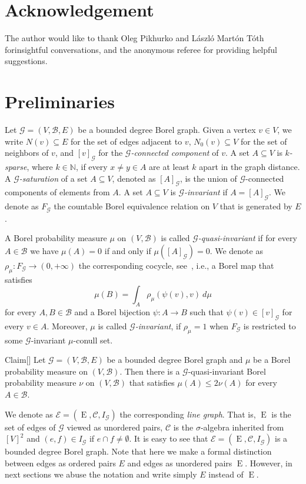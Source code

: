 \documentclass[10pt]{amsart}
\theoremstyle{definition}
\newcommand{\fE}{\operatorname{E}}
\newcommand{\clG}{\mathcal{G}}
\newcommand{\clB}{\mathcal{B}}
\newcommand{\clE}{\mathcal{E}}
\newcommand{\clC}{\mathcal{C}}
\newcommand{\bbZ}{\mathbb{N}}
\begin{document}
\section*{Acknowledgement}
The author would like to thank Oleg Pikhurko and László Martón Tóth for\linebreak insightful conversations, and the anonymous referee for providing helpful suggestions.



\section{Preliminaries}

Let $\clG=(V,\clB,E)$ be a bounded degree Borel graph. Given a vertex $v\in V$, we write $N(v)\subseteq E$ for the set of edges adjacent to $v$, $N_0(v)\subseteq V$ for the set of neighbors of $v$, and $[v]_\clG$ for the \emph{$\clG$-connected component} of $v$. A set $A\subseteq V$ is \emph{$k$-sparse}, where $k\in \bbZ$, if every $x\not=y\in A$ are at least $k$ apart in the graph distance. A \emph{$\clG$-saturation} of a set $A\subseteq V$, denoted as $[A]_\clG$, is the union of $\clG$-connected components of elements from $A$. A set $A\subseteq V$ is \emph{$\clG$-invariant} if $A=[A]_{\clG}$. We denote as $F_\clG$ the countable Borel equivalence relation on $V$ that is generated by $E$.

A Borel probability measure $\mu$ on $(V,\clB)$ is called \emph{$\clG$-quasi-invariant} if for every $A\in \clB$ we have $\mu(A)=0$ if and only if $\mu([A]_\clG)=0$. We denote as $\rho_\mu:F_\clG\to (0,+\infty)$ the corresponding cocycle, see~\cite[Proposition~8.3]{KechrisMiller}, i.e., a Borel map that satisfies
\[
\mu(B)=\int_A \rho_\mu(\psi(v),v) \ d\mu
\]
for every $A,B\in \clB$ and a Borel bijection $\psi:A\to B$ such that $\psi(v)\in [v]_\clG$ for every $v\in A$. Moreover, $\mu$ is called \emph{$\clG$-invariant}, if $\rho_\mu=1$ when $F_\clG$ is restricted to some $\clG$-invariant $\mu$-conull set.


\begin{enonce}{Claim}[{\cite[Proposition~3.2]{Vizing}\label{cl:quasi invariant}}]
Let $\clG=(V,\clB,E)$ be a bounded degree Borel graph and $\mu$ be a Borel probability measure on $(V,\clB)$. Then there is a $\clG$-quasi-invariant Borel probability measure $\nu$ on $(V,\clB)$ that satisfies $\mu(A)\le 2\nu(A)$ for every $A\in \clB$.
\end{enonce}


We denote as $\clE=(\fE,\clC,I_\clG)$ the corresponding \emph{line graph}. That is, $\fE$ is the set of edges of $\clG$ viewed as unordered pairs, $\clC$ is the $\sigma$-algebra inherited from $[V]^2$ and $(e,f)\in I_{\clG}$ if $e\cap f\not =\emptyset$. It is easy to see that $\clE=(\fE,\clC,I_\clG)$ is a bounded degree Borel graph. Note that here we make a formal distinction between edges as ordered pairs $E$ and edges as unordered pairs $\fE$. However, in next sections we abuse the notation and write simply $E$ instead of $\fE$.
\end{document}
